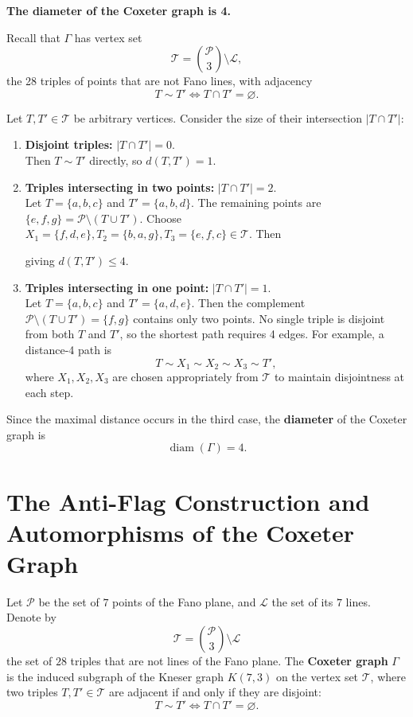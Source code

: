 \documentclass[12pt,a4paper,openany]{book}
\begin{document}
 \textbf{The diameter of the Coxeter graph is 4.}
 
 Recall that $\Gamma$ has vertex set
\[
\mathcal{T} = \binom{\mathcal{P}}{3} \setminus \mathcal{L},
\]
the 28 triples of points that are not Fano lines, with adjacency
\[
T \sim T' \iff T \cap T' = \varnothing.
\]

Let $T, T' \in \mathcal{T}$ be arbitrary vertices. Consider the size of their intersection $|T \cap T'|$:

\begin{enumerate}
    \item \textbf{Disjoint triples:} $|T \cap T'| = 0$. \\
    Then $T \sim T'$ directly, so $d(T,T') = 1$.

    \item \textbf{Triples intersecting in two points:} $|T \cap T'| = 2$. \\
    Let $T = \{a,b,c\}$ and $T' = \{a,b,d\}$. The remaining points are $\{e,f,g\} = \mathcal{P} \setminus (T \cup T')$.  
    Choose $X_1 = \{f,d,e\}, T_2=\{b,a,g\}, T_3=\{e, f,c\} \in \mathcal{T}$. Then
    
    giving $d(T,T')\leq 4$.

    \item \textbf{Triples intersecting in one point:} $|T \cap T'| = 1$. \\
    Let $T = \{a,b,c\}$ and $T' = \{a,d,e\}$. Then the complement $\mathcal{P} \setminus (T \cup T') = \{f,g\}$ contains only two points.  
    No single triple is disjoint from both $T$ and $T'$, so the shortest path requires 4 edges.  
    For example, a distance-4 path is
    \[
    T \sim X_1 \sim X_2 \sim X_3 \sim T',
    \]
    where $X_1,X_2,X_3$ are chosen appropriately from $\mathcal{T}$ to maintain disjointness at each step.
\end{enumerate}

Since the maximal distance occurs in the third case, the \textbf{diameter} of the Coxeter graph is
\[
\operatorname{diam}(\Gamma) = 4.
\]


 
 
 
 
 \section*{The Anti-Flag Construction and Automorphisms of the Coxeter Graph}

Let $\mathcal{P}$ be the set of $7$ points of the Fano plane, and $\mathcal{L}$ the set of its $7$ lines.  
Denote by 
\[
\mathcal{T} = \binom{\mathcal{P}}{3} \setminus \mathcal{L}
\]
the set of $28$ triples that are not lines of the Fano plane.  
The \textbf{Coxeter graph} $\Gamma$ is the induced subgraph of the Kneser graph $K(7,3)$ on the vertex set $\mathcal{T}$, where two triples $T,T'\in\mathcal{T}$ are adjacent if and only if they are disjoint:
\[
T\sim T' \iff T\cap T'=\varnothing.
\]
\end{document}
